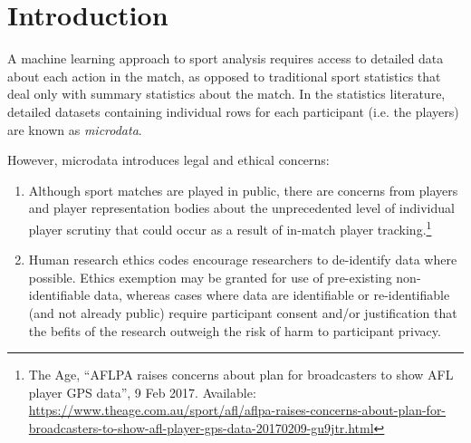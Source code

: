 \section{Introduction}

A machine learning approach to sport analysis requires access to detailed data about each action in the match, %
as opposed to traditional sport statistics that deal only with summary statistics about the match. In the statistics literature, detailed datasets containing individual rows for each participant (i.e. the players) are known as \textit{microdata}.



However, microdata introduces legal and ethical concerns:

\begin{enumerate}

\item Although sport matches are played in public, there are concerns from players and player representation bodies about the unprecedented level of individual player scrutiny that could occur as a result of in-match player tracking.\footnote{The Age, ``AFLPA raises concerns about plan for broadcasters to show AFL player GPS data'', 9 Feb 2017. Available: \url{https://www.theage.com.au/sport/afl/aflpa-raises-concerns-about-plan-for-broadcasters-to-show-afl-player-gps-data-20170209-gu9jtr.html}}

\item Human research ethics codes encourage researchers to de-identify data where possible. Ethics exemption may be granted for use of pre-existing non-identifiable data, whereas cases where data are identifiable or re-identifiable (and not already public) require participant consent and/or justification that the befits of the research outweigh the risk of harm to participant privacy.

\end{enumerate}

